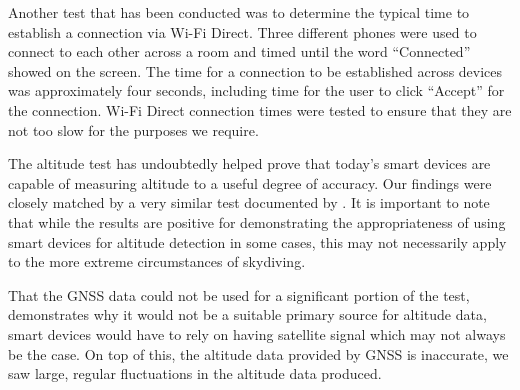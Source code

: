 Another test that has been conducted was to determine the typical time to establish a connection via Wi-Fi Direct. Three different phones were used to connect to each other across a room and timed until the word ``Connected'' showed on the screen. The time for a connection to be established across devices was approximately four seconds, including time for the user to click ``Accept'' for the connection. Wi-Fi Direct connection times were tested to ensure that they are not too slow for the purposes we require.

The altitude test has undoubtedly helped prove that today's smart devices are capable of measuring altitude to a useful degree of accuracy. Our findings were closely matched by a very similar test documented by \textcite{he_atmospheric_2012}. It is important to note that while the results are positive for demonstrating the appropriateness of using smart devices for altitude detection in some cases, this may not necessarily apply to the more extreme circumstances of skydiving.

That the GNSS data could not be used for a significant portion of the test, demonstrates why it would not be a suitable primary source for altitude data, smart devices would have to rely on having satellite signal which may not always be the case. On top of this, the altitude data provided by GNSS is inaccurate, we saw large, regular fluctuations in the altitude data produced.

